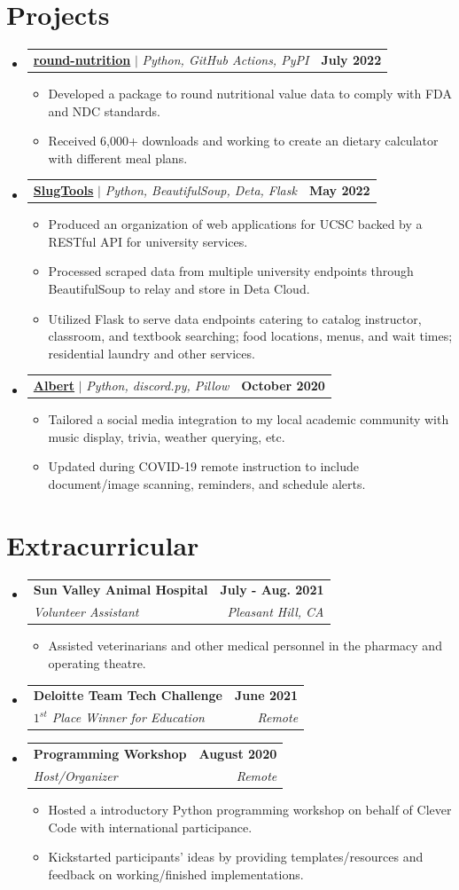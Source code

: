 \documentclass[letterpaper,11pt]{article}
\makeatletter
\newcommand{\resumeItem}[1]{
  \item\small{
    {#1 \vspace{-2pt}}
  }
}
\newcommand{\resumeSubheading}[4]{
  \vspace{-2pt}\item
    \begin{tabular*}{1.0\textwidth}[t]{l@{\extracolsep{\fill}}r}
      \textbf{#1} & \textbf{\small #2} \\
      \textit{\small#3} & \textit{\small #4} \\
    \end{tabular*}\vspace{-7pt}
}
\newcommand{\resumeProjectHeading}[2]{
    \item
    \begin{tabular*}{1.001\textwidth}{l@{\extracolsep{\fill}}r}
      \small#1 & \textbf{\small #2}\\
    \end{tabular*}\vspace{-7pt}
}
\newcommand{\resumeSubHeadingListStart}{\begin{itemize}[leftmargin=0.0in, label={}]}
\newcommand{\resumeSubHeadingListEnd}{\end{itemize}}
\newcommand{\resumeItemListStart}{\begin{itemize}}
\newcommand{\resumeItemListEnd}{\end{itemize}\vspace{-5pt}}
\makeatother
\begin{document}
\section{Projects}
\vspace{-5pt}
\resumeSubHeadingListStart
\resumeProjectHeading
{\textbf{\color[HTML]{0000EE}\href{https://pypi.org/project/round-nutrition/}{round-nutrition}} $|$ \emph{Python, GitHub Actions, PyPI}}{July 2022}
\resumeItemListStart
\resumeItem{Developed a package to round nutritional value data to comply with FDA and NDC standards.}
\resumeItem{Received 6,000+ downloads and working to create an dietary calculator with different meal plans.}
\resumeItemListEnd
\vspace{-13pt}
\resumeProjectHeading
{\textbf{\color[HTML]{0000EE}\href{https://api.slug.tools}{SlugTools}} $|$ \emph{Python, BeautifulSoup, Deta, Flask}}{May 2022}
\resumeItemListStart
\resumeItem{Produced an organization of web applications for UCSC backed by a RESTful API for university services.}
\resumeItem{Processed scraped data from multiple university endpoints through BeautifulSoup to relay and store in Deta Cloud.}
\resumeItem{Utilized Flask to serve data endpoints catering to catalog instructor, classroom, and textbook searching; food locations, menus, and wait times; residential laundry and other services.}
\resumeItemListEnd
\vspace{-13pt}
\resumeProjectHeading
{\textbf{\color[HTML]{0000EE}\href{https://github.com/hdadhich01/Albert}{Albert}} $|$ \emph{Python, discord.py, Pillow}}{October 2020}
\resumeItemListStart
\resumeItem{Tailored a social media integration to my local academic community with music display, trivia, weather querying, etc.}
\resumeItem{Updated during COVID-19 remote instruction to include document/image scanning, reminders, and schedule alerts.}
\resumeItemListEnd
\resumeSubHeadingListEnd
\vspace{-15pt}

\section{Extracurricular}
\resumeSubHeadingListStart
\resumeSubheading{Sun Valley Animal Hospital}{July - Aug. 2021}{Volunteer Assistant}{Pleasant Hill, CA}
\resumeItemListStart
\resumeItem{Assisted veterinarians and other medical personnel in the pharmacy and operating theatre.}
\resumeItemListEnd
\resumeSubheading{Deloitte Team Tech Challenge}{June 2021}{$1^{st}$ Place Winner for Education}{Remote}
\resumeSubheading{Programming Workshop}{August 2020}{Host/Organizer}{Remote}
\resumeItemListStart
\resumeItem{Hosted a introductory Python programming workshop on behalf of Clever Code with international participance.}
\resumeItem{Kickstarted participants' ideas by providing templates/resources and feedback on working/finished implementations.}
\resumeItemListEnd
\resumeSubHeadingListEnd
\vspace{-15pt}
\end{document}
